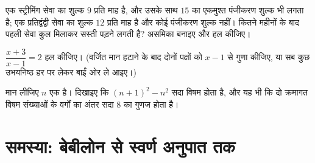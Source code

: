\begin{exercise}[$\star\star$]\label{exo:g10:algebra:9}
एक स्ट्रीमिंग सेवा का शुल्क $9$ प्रति माह है, और उसके साथ $15$ का
एकमुश्त पंजीकरण शुल्क भी लगता है; एक प्रतिद्वंद्वी सेवा का शुल्क $12$
प्रति माह है और कोई पंजीकरण शुल्क नहीं। कितने महीनों के बाद पहली सेवा
कुल मिलाकर सस्ती पड़ने लगती है? असमिका बनाइए और हल कीजिए।
\end{exercise}

\begin{exercise}[$\star\star$]\label{exo:g10:algebra:10}
$\dfrac{x+3}{x-1} = 2$ हल कीजिए। (वर्जित मान हटाने के बाद दोनों पक्षों को $x - 1$ से गुणा
कीजिए, या सब कुछ उभयनिष्ठ हर पर लेकर बाईं ओर ले आइए।)
\end{exercise}

\begin{exercise}[$\star\star\star$]\label{exo:g10:algebra:11}
मान लीजिए $n$ एक  है। दिखाइए कि $(n + 1)^2 - n^2$ सदा विषम होता है, और यह भी
कि दो क्रमागत विषम संख्याओं के वर्गों का अंतर सदा $8$ का गुणज होता है।
\end{exercise}

\section{समस्या: बेबीलोन से स्वर्ण अनुपात तक}

